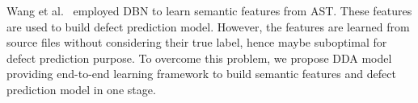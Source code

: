 
Wang et al.~\cite{wang2016automatically} employed DBN to learn semantic features from AST. These features are used to build defect prediction model. However, the features are learned from source files without considering their true label, hence maybe suboptimal for defect prediction purpose. To overcome this problem, we propose DDA model providing end-to-end learning framework to build semantic features and defect prediction model in one stage. 



